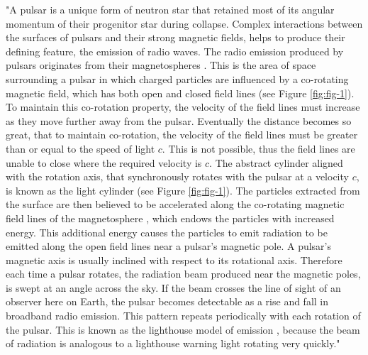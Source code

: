 "A pulsar is a unique form of neutron star that retained most of its angular momentum of their progenitor star during collapse. Complex interactions between the surfaces of pulsars and their strong magnetic fields, helps to produce their defining feature, the emission of radio waves. The radio emission produced by pulsars originates from their magnetospheres \citep{ghosh}. This is the area of space surrounding a pulsar in which charged particles are influenced by a co-rotating magnetic field, which has both open and closed field lines \citep{lorimer} (see Figure \ref{fig:fig-1}). To maintain this co-rotation property, the velocity of the field lines must increase as they move further away from the pulsar. Eventually the distance becomes so great, that to maintain co-rotation, the velocity of the field lines must be greater than or equal to the speed of light $c$. This is not possible, thus the field lines are unable to close where the required velocity is $c$. The abstract cylinder aligned with the rotation axis, that synchronously rotates with the pulsar at a velocity $c$, is known as the light cylinder (see Figure \ref{fig:fig-1}). The particles extracted from the surface are then believed to be accelerated along the co-rotating magnetic field lines of the magnetosphere \citep{lorimer2008}, which endows the particles with increased energy. This additional energy causes the particles to emit radiation \citep{lorimer2008} to be emitted along the open field lines near a pulsar's magnetic pole. A pulsar's magnetic axis is usually inclined with respect to its rotational axis. Therefore each time a pulsar rotates, the radiation beam produced near the magnetic poles, is swept at an angle across the sky. If the beam crosses the line of sight of an observer here on Earth, the pulsar becomes detectable as a rise and fall in broadband radio emission. This pattern repeats periodically with each rotation of the pulsar. This is known as the lighthouse model of emission \citep{lorimer2008}, because the beam of radiation is analogous to a lighthouse warning light rotating very quickly."
